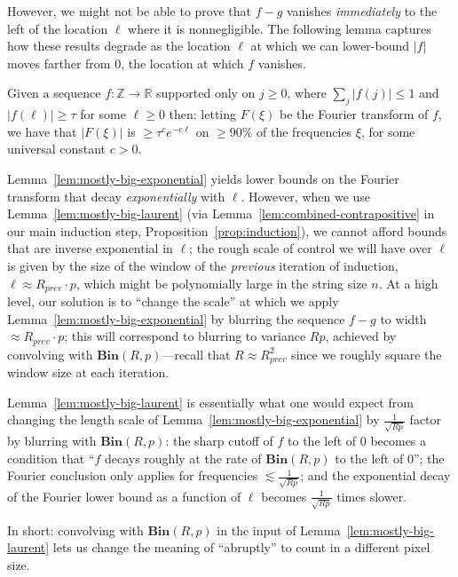 \documentclass[11pt]{article}
\theoremstyle{plain}
\newcommand{\Bin}[2]{\textbf{Bin}(#1,#2)}
\begin{document}
However, we might not be able to prove that $f-g$ vanishes \emph{immediately} to the left of the location $\ell$ where it is nonnegligible. The following lemma captures how these results degrade as the location $\ell$ at which we can lower-bound $|f|$ moves farther from 0, the location at which $f$ vanishes.

\begin{lemma}\label{lem:mostly-big-exponential}
Given a sequence $f:\mathbb{Z}\rightarrow\mathbb{R}$ supported only on $j\geq 0$, where $\sum_j |f(j)|\leq 1$ and $|f(\ell)|\geq \tau$ for some $\ell\geq 0$ then: letting $F(\xi)$ be the Fourier transform of $f$, we have that $|F(\xi)|$ is $\geq \tau^c e^{-c \ell}$ on $\geq 90\%$ of the frequencies $\xi$, for some universal constant $c>0$.
\end{lemma}

Lemma~\ref{lem:mostly-big-exponential} yields lower bounds on the Fourier transform that decay \emph{exponentially} with $\ell$. However, when we use Lemma~\ref{lem:mostly-big-laurent} (via Lemma~\ref{lem:combined-contrapositive} in our main induction step, Proposition~\ref{prop:induction}), we cannot afford bounds that are inverse exponential in $\ell$; the rough scale of control we will have over $\ell$ is given by the size of the window of the \emph{previous} iteration of induction, $\ell\approx R_{prev}\cdot p$, which might be polynomially large in the string size $n$. At a high level, our solution is to ``change the scale'' at which we apply Lemma~\ref{lem:mostly-big-exponential} by blurring the sequence $f-g$ to width $\approx R_{prev}\cdot p$; this will correspond to blurring to variance $Rp$, achieved by convolving with $\Bin{R}{p}$---recall that $R\approx R_{prev}^2$ since we roughly square the window size at each iteration.

Lemma~\ref{lem:mostly-big-laurent} is essentially what one would expect from changing the length scale of Lemma~\ref{lem:mostly-big-exponential} by $\frac{1}{\sqrt{Rp}}$ factor by blurring with $\Bin{R}{p}$: the sharp cutoff of $f$ to the left of $0$ becomes a condition that ``$f$ decays roughly at the rate of $\Bin{R}{p}$ to the left of 0''; the Fourier conclusion only applies for frequencies $\lesssim\frac{1}{\sqrt{Rp}}$; and the exponential decay of the Fourier lower bound as a function of $\ell$ becomes $\frac{1}{\sqrt{Rp}}$ times slower.
 
In short: convolving with $\Bin{R}{p}$ in the input of Lemma~\ref{lem:mostly-big-laurent} lets us change the meaning of ``abruptly'' to count in a different pixel size.
\end{document}
